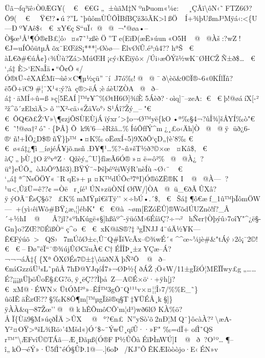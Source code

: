 Üã¬fq³ïê›Ò0ÆG¥( € 
€€G„±ùãM‡NºnÞuom\textbar«¼¢:¸ÇÃï\textbackslash ôN‹˜FTZ6Ø?Ô9(  € 
~Ÿ€!?•ú?''L˜þûômÙÛÔÌBƒBÇž3öÃK\textgreater lßÖ~Í+¾þ­UßmJ³Mÿá‹:\textless\{U---Ðº¥Aê\$‹ 
€ xY€çS``uÏ‹@ @ ¬"@øa•--Ò§œ¹Å¹¶Ó®¢B£¦ô›¤s7˜¹zßèÖ''Te(EïÐ(æË»úun«O5H@ @Àš:?wZ!€J=uÍÔôütµÂõx¨EŒžS¡***¦-Øòø---ËlvØíÛ.é³;û4??
hªŠ  € 
àL€ð\#€úÅ¢\}‹¾Ùù?Zá\textgreater MúŒH¡cý‹KËïÿô×/Úi›æÕÝš½wK¯ØHCŽÑ±ð\$\ldots 
€  `‚ á‡
È\textgreater`ENaÎä•``Õ¢Ô«/Ó®tÜ\textasciitilde êXAÉMï¬ùê×C¶µ½çü''¯íJ7ó‰\textgreater@!@ @ ¯ð\textbackslash èõ\&0© Ï®\textasciitilde6«0KÍl\textbar Ïñ?ë5Ö+ïC9\#¦¯X¹«:ý?à~ç®\textgreater ëÁ;èáèUZÒA @ ð-- á‡·äMÍ÷û=ß»ç{[}5ËAÍ{]}™r¥\^{}\%ØtH6Ø{]}¾íÈ
5Áèð?·oìq{]}¯--zeA: €  € þ!@øáíX{[}-²
²ž\^{}õ´zElxìÄ\textgreaterõ''X²-cä›«ŽäVo°›S¹Áî?Žý\_--"€ 
€ ÔQ€ð£Ž`V»\textbackslash¶¢zjÕSÙEÙjÁïýxr´\textgreater‡o¬Ø™yë\{kO•ª‰§4¬?ûÎ¾{]}šÅYÍ‰ò"€ 
€ ˜!@øa†²ó˜·\{ÞÂ\}Õk9ì'6---èRžã\ldots\%Íú­ÔfƒÝ\^{}m¿¸£o‹Äh{]}Ò\textquotesingle@ @ ÿ
üð¿6­®`ñ!+ÎÕ¿\textquotesingle D\$®ñŸ\}þ™•¤K‰oËøxÍ\textasciitilde5)9XðÕ`çD„†è'8‰
€  € ø« á‡¿¶ì\_íøjéÁ¥jõ.nsñ­.Ð¥¶¹\ldots\%?\textasciitilde ñ»šT½ð?©×œ¤Kâ\$‚  € 
àÇ„þÙ¸‡OžºvªZ·Qžèý„\^{}U\}fîæÃ6Ó®»¤ë=ô²\%@ @À¿?ü°\}eÚÕ„òJòÔºMê3).BŸÝ¨\textasciitilde ÞšþéºêiWýR'nèÍù\textasciitilde Ø‹¨
€  `„ á‡ª\^{}NsÖÖY«¯RqE»+µ¤K™dÚÕc³7ªI)Ó®ôZË®K
I@ @À---?\textbar¹u\textless,ÛžÜ=ê??¢=Òër¸íé¹ÚN»züÒNÍØfW/{]}ÒA @ ü\_€ðÃÛXâ?ÿýOÃ¨ÊsÇ§ô?£K\%mMŸµî€šTÿ''×÷bÚ•.´\$‚ 
€ Š á‡¶ô€æf\_1û™þÏômÖW---+(yì‹êiWõ\#BŸ¿æ,¦{]}ébK" € 
€@à\textasciitilde øm{[}ËZóËÛ{]}®WõdÚUZnõ!ƒ?\_Â´+½hI@ 
Â? jl?«ºhKúgë«§{]}hßàº\^{}-ÿüóM›6ÉíãÇ?÷¬²hÑ¢r†Òþýû›7oîY"\^{}¿ë§-Gn\}o?ZŒ?©ÉïßÒ``ç\^{}o
€ 
€ xK@ãS®?‡³gÏNJJ4¨úÄ½¥K---Ê€Fýúõ\textgreaterQS›7mÚôØ±c‚Û¨Q\#ÏšVcÃx--©¾wÉ´«\^{}\^{}œ\textasciitilde¼jè\#\&"tÁý›2ô¡¯2©!€ 
€ --Ðø''ëÏ``¯®¾újÛØCšuÀ€C†ÉÎÎÞ¸±zYÇæ--Á?¬¬¬áÃ‡\{\{XªÕXØÉs7©±‡\textbackslash ôäðNÄþÑ²Ô@ ð--€náGzzúÜ¹s\textquotesingle L˜pñÅ7hÐ@YJqóÍ7»¬ØÞ½\{\textbar ðÁŽ;Ö«W/11±gÏžÓ¦MËÏÏwy£g„\ldots\ldots É?¡¡¡µÜþöÛoË§£G?ö,ÿ¸ëÇ??Ìþå~Z---A©É×ö`·+ÿh{[}j? 
€ xM@·ÉWN×ÜtÓM²°»--ÊÍ™3gÔ¨Q¹¹¹v×¤¦¦Î›7/\%\%E\_˜\}ûöIÊäÈzŒ??§‰K8Ô¶m{[}™\textbar µgÏžš®q§T‡¥ÜÉÂ¸k§{]}\}ÿÀÀ\&q¬87Žœ''@ @ kh\textbar ÊÕmôCÕ'm¦d³)wð6lØ
KÀ\%ö?ÅÏ\{Ùä9§M»úçðÎÄ\textgreater ÛX@ °?€n£\textquotesingle N''ySò'õ2nÐ¦MQ¨\}ôcàÀ?²\textbackslash æA-Y²¤OŸ\textgreater ªšL¾Rö›'4\textquotesingle Mšd«)Ó´\$\textasciitilde¨ÝwÜ¸qíÛ··»F"
‰=dÏ+ ofÌ˜QS
r™''\textbackslash ÆFvîÜ©TÁã---Æ¸Ðã\textbar µß(Ó®FP½ÛÕàÉïÞÌnWÚ{]}I@ ð?O¹º\ldots¶--î„kÖ¬éÝ»·Ü5fÌ˜éÓ§ÛÞ.1@---.{]}6oÞ/KJ''ÕÊKÆIòòòjo·E‹ÉN»v

